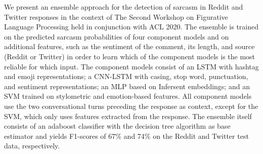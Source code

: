We present an ensemble approach for the detection of sarcasm in Reddit and Twitter responses in the context of The Second Workshop on Figurative Language Processing held in conjunction with ACL 2020. The ensemble is trained on the predicted sarcasm probabilities of four component models and on additional features, such as the sentiment of the comment, its length, and source (Reddit or Twitter) in order to learn which of the component models is the most reliable for which input. The component models consist of an LSTM with hashtag and emoji representations; a CNN-LSTM with casing, stop word, punctuation, and sentiment representations; an MLP based on Infersent embeddings; and an SVM trained on stylometric and emotion-based features. All component models use the two conversational turns preceding the response as context, except for the SVM, which only uses features extracted from the response. The ensemble itself consists of an adaboost classifier with the decision tree algorithm as base estimator and yields F1-scores of 67\% and 74\% on the Reddit and Twitter test data, respectively.
